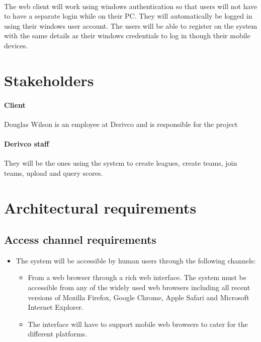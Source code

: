 \documentclass[11pt,a4paper]{article}
\begin{document}
\paragraph{}The web client will work using windows authentication so that users will not have to have a separate login while on their PC. They will automatically be logged in using their windows user account. The users will be able to register on the system with the same details as their windows credentials to log in though their mobile devices.
\section{Stakeholders}
	\paragraph{Client} Douglas Wilson is an employee at Derivco and is responsible for the project
	\paragraph{Derivco staff} They will be the ones using the system to create leagues, create teams, join teams, upload and query scores. 	
\section{Architectural requirements}
\subsection{Access channel requirements}
\begin{itemize}
\item The system will be accessible by human users through the following channels:
	\begin{itemize}
	\item From a web browser through a rich web interface. The system must be accessible from any of the widely used web browsers including all recent versions of Mozilla Firefox, Google Chrome, Apple Safari 	and Microsoft Internet Explorer.
	\item The interface will have to support mobile web browsers to cater for the different platforms.
	\end{itemize}
\end{itemize}
\end{document}
